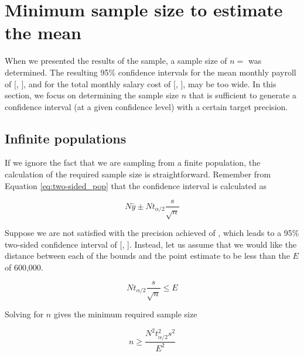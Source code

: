 

\section{Minimum sample size to estimate the mean} %
\label{sec:estimating_the_sample_size}
When we presented the results of the sample, a sample size of $n =$ \EstMeanSampleSize was  determined. The resulting 95\% confidence intervals for the mean monthly payroll of [, ], and for the total monthly salary cost of [, ], may be too wide. In this section, we focus on determining the sample size $n$ that is sufficient to generate a confidence interval (at a given confidence level) with a certain target precision. 

\subsection{Infinite populations} %
\label{sub:infinite_populations}

If we ignore the fact that we are sampling from a finite population, the calculation of the required sample size is straightforward. Remember from Equation \ref{eq:two-sided_pop} that the confidence interval is calculated as 

\begin{equation*}
  N \bar{y} \pm N t_{\alpha/2} \frac{s}{\sqrt{n}}
\end{equation*}

Suppose we are not satisfied with the precision achieved of , which leads to a 95\% two-sided confidence interval of [, ]. Instead, let us assume that we would like the distance between each of the bounds and the point estimate to be less than the  $E$ of 600,000. 

\begin{equation*}
  N t_{\alpha/2} \frac{s}{\sqrt{n}} \leq E
\end{equation*}

Solving for $n$ gives the minimum required sample size

\begin{equation}
\label{eq:minimum_sample_size}
  n \geq \frac{N^2 t_{\alpha/2}^2 s^2}{E^2}
\end{equation}

